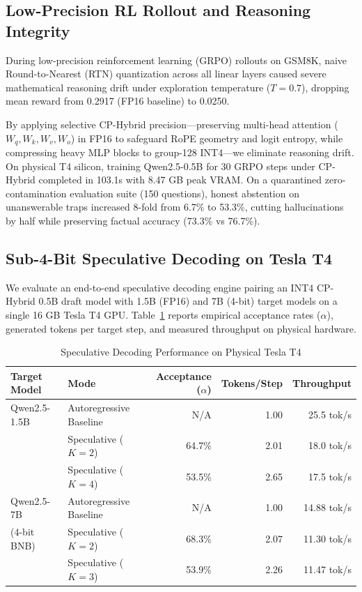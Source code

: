 \documentclass[10pt,twocolumn,letterpaper]{article}
\begin{document}
\subsection{Low-Precision RL Rollout and Reasoning Integrity}
During low-precision reinforcement learning (GRPO) rollouts on GSM8K, naive Round-to-Nearest (RTN) quantization across all linear layers caused severe mathematical reasoning drift under exploration temperature ($T=0.7$), dropping mean reward from 0.2917 (FP16 baseline) to 0.0250. 

By applying selective CP-Hybrid precision---preserving multi-head attention ($W_q, W_k, W_v, W_o$) in FP16 to safeguard RoPE geometry and logit entropy, while compressing heavy MLP blocks to group-128 INT4---we eliminate reasoning drift. On physical T4 silicon, training Qwen2.5-0.5B for 30 GRPO steps under CP-Hybrid completed in 103.1s with 8.47 GB peak VRAM. On a quarantined zero-contamination evaluation suite (150 questions), honest abstention on unanswerable traps increased 8-fold from 6.7\% to 53.3\%, cutting hallucinations by half while preserving factual accuracy (73.3\% vs 76.7\%).

\subsection{Sub-4-Bit Speculative Decoding on Tesla T4}
We evaluate an end-to-end speculative decoding engine pairing an INT4 CP-Hybrid 0.5B draft model with 1.5B (FP16) and 7B (4-bit) target models on a single 16 GB Tesla T4 GPU. Table~\ref{tab:spec_eval} reports empirical acceptance rates ($\alpha$), generated tokens per target step, and measured throughput on physical hardware.

\begin{table}[h]
\centering
\caption{Speculative Decoding Performance on Physical Tesla T4}
\label{tab:spec_eval}
\small
\begin{tabular}{llrrr}
\toprule
Target Model & Mode & Acceptance ($\alpha$) & Tokens/Step & Throughput \\
\midrule
Qwen2.5-1.5B & Autoregressive Baseline & N/A    & 1.00 & 25.5 tok/s \\
             & Speculative ($K=2$)      & 64.7\% & 2.01 & 18.0 tok/s \\
             & Speculative ($K=4$)      & 53.5\% & 2.65 & 17.5 tok/s \\
\midrule
Qwen2.5-7B   & Autoregressive Baseline & N/A    & 1.00 & 14.88 tok/s \\
(4-bit BNB)  & Speculative ($K=2$)      & 68.3\% & 2.07 & 11.30 tok/s \\
             & Speculative ($K=3$)      & 53.9\% & 2.26 & 11.47 tok/s \\
\bottomrule
\end{tabular}
\end{table}
\end{document}
